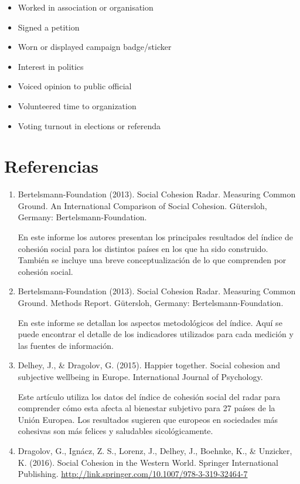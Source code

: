 \documentclass[
  12pt,
]{book}
\providecommand{\tightlist}{%
  \setlength{\itemsep}{0pt}\setlength{\parskip}{0pt}}
\begin{document}
\begin{itemize}
\tightlist
\item
  Worked in association or organisation
\item
  Signed a petition
\item
  Worn or displayed campaign badge/sticker
\item
  Interest in politics
\item
  Voiced opinion to public official
\item
  Volunteered time to organization
\item
  Voting turnout in elections or referenda
\end{itemize}

\hypertarget{referencias}{%
\section{Referencias}\label{referencias}}

\begin{enumerate}
\def\labelenumi{\arabic{enumi}.}
\item
  Bertelsmann-Foundation (2013). Social Cohesion Radar. Measuring
  Common Ground. An International Comparison of Social Cohesion.
  Gütersloh, Germany: Bertelsmann-Foundation.

  En este informe los autores presentan los principales resultados del
  índice de cohesión social para los distintos países en los que ha
  sido construido. También se incluye una breve conceptualización de
  lo que comprenden por cohesión social.
\item
  Bertelsmann-Foundation (2013). Social Cohesion Radar. Measuring
  Common Ground. Methods Report. Gütersloh, Germany:
  Bertelsmann-Foundation.

  En este informe se detallan los aspectos metodológicos del índice.
  Aquí se puede encontrar el detalle de los indicadores utilizados
  para cada medición y las fuentes de información.
\item
  Delhey, J., \& Dragolov, G. (2015). Happier together. Social cohesion
  and subjective wellbeing in Europe. International Journal of
  Psychology.

  Este artículo utiliza los datos del índice de cohesión social del
  radar para comprender cómo esta afecta al bienestar subjetivo para
  27 países de la Unión Europea. Los resultados sugieren que europeos
  en sociedades más cohesivas son más felices y saludables
  sicológicamente.
\item
  Dragolov, G., Ignácz, Z. S., Lorenz, J., Delhey, J., Boehnke, K., \& Unzicker, K. (2016). Social Cohesion in the Western World. Springer International Publishing. \url{http://link.springer.com/10.1007/978-3-319-32464-7}
\end{enumerate}
\end{document}
